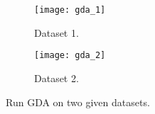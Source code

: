 \begin{answer}

\begin{figure}[H]
	\centering
	\begin{subfigure}[H]{0.45\linewidth}
		\texttt{[image: gda\_1]}
		\caption{Dataset 1.}
	\end{subfigure}
	\begin{subfigure}[H]{0.45\linewidth}
		\texttt{[image: gda\_2]}
		\caption{Dataset 2.}
	\end{subfigure}
	\caption{Run GDA on two given datasets.}
\end{figure}

\end{answer}

